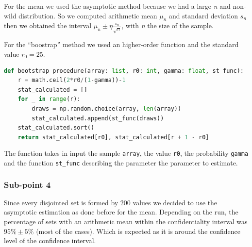 \documentclass[10pt,a4paper]{article}
\begin{document}
For the mean we used the asymptotic method because we had a large \emph{n} and non-wild distribution. So we computed arithmetic mean \(\mu_{n}\) and standard deviation \(s_{n}\) then we obtained the interval \(\mu_{n}\pm \eta\frac{s_{n}}{\sqrt{n}}\), with \emph{n} the size of the sample.

For the ``boostrap'' method we used an higher-order function and the standard value \(r_{0} = 25\).
\begin{lstlisting}[language=python]
def bootstrap_procedure(array: list, r0: int, gamma: float, st_func):
    r = math.ceil(2*r0/(1-gamma))-1
    stat_calculated = []
    for _ in range(r):
        draws = np.random.choice(array, len(array))
        stat_calculated.append(st_func(draws))
    stat_calculated.sort()
    return stat_calculated[r0], stat_calculated[r + 1 - r0]
\end{lstlisting}
The function takes in input the sample \texttt{array}, the value \texttt{r0}, the probability \texttt{gamma} and the function \texttt{st\_func} describing the parameter the parameter to estimate.

\subsubsection*{Sub-point 4}

Since every disjointed set is formed by \(200\) values we decided to use the asymptotic estimation as done before for the mean. Depending on the run, the percentage of sets with an arithmetic mean within the confidentiality interval was \(95\%\pm5\%\) (most of the cases). Which is expected as it is around the confidence level of the confidence interval.
\end{document}
